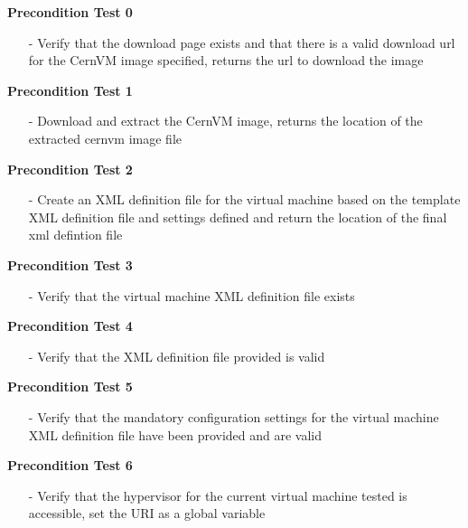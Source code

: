 \begin{description}
\item {\bf	 Precondition Test 0}
		\begin{itemize}
		\item[-] 	Verify that the download page exists and that there is a valid download url for the CernVM 
						image specified, returns the url to download the image
		\end{itemize}

\item {\bf	 Precondition Test 1}
		\begin{itemize}
		\item[-]	Download and extract the CernVM image, returns the location of the extracted cernvm image file
		\end{itemize}

\item {\bf	 Precondition Test 2}
		\begin{itemize}
		\item[-]	Create an XML definition file for the virtual machine based on the template XML definition file and
						settings defined and return the location of the final xml defintion file
		\end{itemize}
		
\item {\bf	 Precondition Test 3}
		\begin{itemize}
		\item[-]	Verify that the virtual machine XML definition file exists
		\end{itemize}

\item {\bf	 Precondition Test 4}
		\begin{itemize}
		\item[-]	Verify that the XML definition file provided is valid
		\end{itemize}
		
\item {\bf	 Precondition Test 5}
		\begin{itemize}
		\item[-]	Verify that the mandatory configuration settings for the virtual machine XML definition file have
						been provided and are valid
		\end{itemize}

\item {\bf	 Precondition Test 6}
		\begin{itemize}
		\item[-]	Verify that the hypervisor for the current virtual machine tested is accessible, set the URI as a 
						global variable
		\end{itemize}


\end{description}
